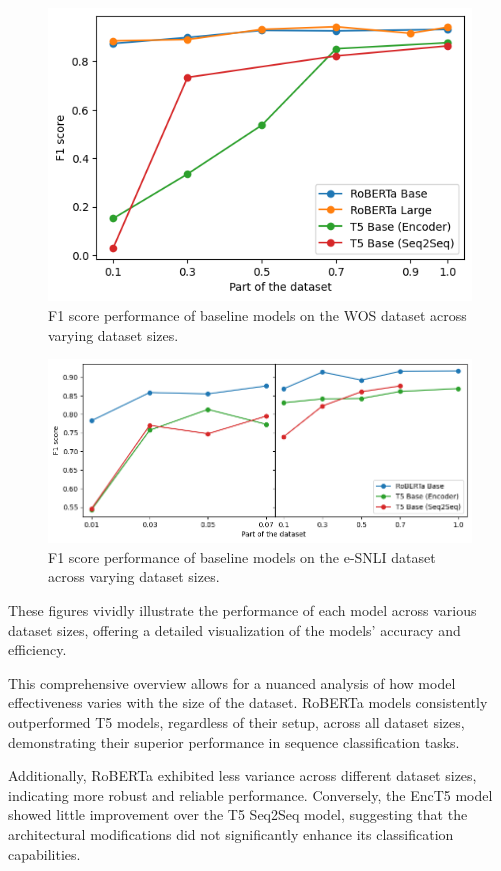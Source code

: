 \begin{figure}[p]
    \centering
    \includegraphics[width=0.6\linewidth]{figs/wos_baseline.png}
    \caption{F1 score performance of baseline models on the WOS dataset across varying dataset sizes.}
    \label{fig:baselines:wos}
\end{figure}
\begin{figure}[p]
    \centering
    \includegraphics[width=\linewidth]{figs/esnli_baseline.png}
    \caption{F1 score performance of baseline models on the e-SNLI dataset across varying dataset sizes.}
    \label{fig:baselines:esnli}
\end{figure}

These figures vividly illustrate the performance of each model across various dataset sizes, offering a detailed visualization of the models' accuracy and efficiency.

This comprehensive overview allows for a nuanced analysis of how model effectiveness varies with the size of the dataset. RoBERTa models consistently outperformed T5 models, regardless of their setup, across all dataset sizes, demonstrating their superior performance in sequence classification tasks.

Additionally, RoBERTa exhibited less variance across different dataset sizes, indicating more robust and reliable performance. Conversely, the EncT5 model showed little improvement over the T5 Seq2Seq model, suggesting that the architectural modifications did not significantly enhance its classification capabilities.

